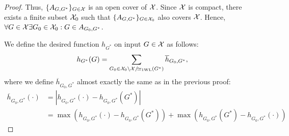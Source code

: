 \begin{proof}
    Thus, $\{ A_{G, G^*} \}_{G \in \mathcal{X}}$ is an open cover of $\mathcal{X}$. Since $\mathcal{X}$ is compact, there exists a finite subset $\mathcal{X}_0$ such that $\{ A_{G, G^*} \}_{G \in \mathcal{X}_0}$ also covers $\mathcal{X}$. Hence, $\forall G \in \mathcal{X} \exists G_0 \in \mathcal{X}_0: G \in A_{G_0, G^*}$.


    We define the desired function $h_{G^*}$ on input $G \in \mathcal{X}$ as follows:
    \begin{equation}\label{eq:continuous_proof4}
        h_{G^*}(G) = \sum_{G_0 \in \mathcal{X}_0 \setminus \mathcal{X}/\!{\simeq_{\text{1WL}}}(G^*)} \overline{h}_{G_0, G^*},
    \end{equation}
    where we define $\overline{h}_{G_0, G^*}$ almost exactly the same as in the previous proof:
    \begin{align}
        \overline{h}_{G_0, G^*}(\cdot) &= |h_{G_0, G^*}(\cdot) - h_{G_0, G^*}(G^*)| \\
        &= \max(h_{G_0, G^*}(\cdot) - h_{G_0, G^*}(G^*)) + \max(h_{G_0, G^*}(G^*) - h_{G_0, G^*}(\cdot))\label{eq:continuous_proof5}
    \end{align}


\end{proof}
